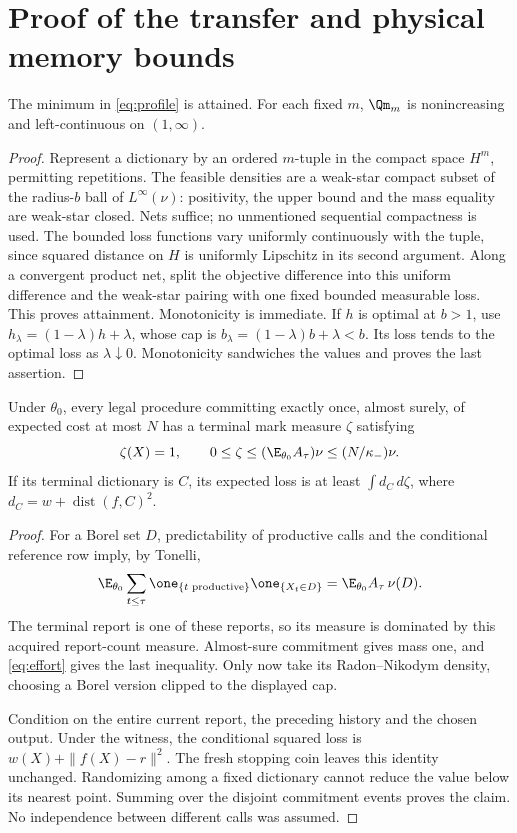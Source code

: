 \section{Proof of the transfer and physical memory bounds}
\begin{lemma}\label{lem:attain}
The minimum in \eqref{eq:profile} is attained. For each fixed $m$, $\Qm_m$ is nonincreasing and left-continuous on $(1,\infty)$.
\end{lemma}
\begin{proof}
Represent a dictionary by an ordered $m$-tuple in the compact space $H^m$, permitting repetitions. The feasible densities are a weak-star compact subset of the radius-$b$ ball of $L^\infty(\nu)$: positivity, the upper bound and the mass equality are weak-star closed. Nets suffice; no unmentioned sequential compactness is used. The bounded loss functions vary uniformly continuously with the tuple, since squared distance on $H$ is uniformly Lipschitz in its second argument. Along a convergent product net, split the objective difference into this uniform difference and the weak-star pairing with one fixed bounded measurable loss. This proves attainment. Monotonicity is immediate. If $h$ is optimal at $b>1$, use $h_\lambda=(1-\lambda)h+\lambda$, whose cap is $b_\lambda=(1-\lambda)b+\lambda<b$. Its loss tends to the optimal loss as $\lambda\downarrow0$. Monotonicity sandwiches the values and proves the last assertion.
\end{proof}

\begin{lemma}\label{lem:lower}
Under $\theta_0$, every legal procedure committing exactly once, almost surely, of expected cost at most $N$ has a terminal mark measure $\zeta$ satisfying
\begin{equation}\label{eq:dominated-terminal}
 \zeta(X)=1,\qquad
 0\le\zeta\le (\E_{\theta_0}A_\tau)\nu\le (N/\kappa_-)\nu.
\end{equation}
If its terminal dictionary is $C$, its expected loss is at least $\int d_C\,d\zeta$, where $d_C=w+\operatorname{dist}(f,C)^2$.
\end{lemma}
\begin{proof}
For a Borel set $D$, predictability of productive calls and the conditional reference row imply, by Tonelli,
\[
 \E_{\theta_0}\sum_{t\le\tau}\one_{\{t\text{ productive}\}}\one_{\{X_t\in D\}}
   =\E_{\theta_0}A_\tau\,\nu(D).
\]
The terminal report is one of these reports, so its measure is dominated by this acquired report-count measure. Almost-sure commitment gives mass one, and \eqref{eq:effort} gives the last inequality. Only now take its Radon--Nikodym density, choosing a Borel version clipped to the displayed cap.

Condition on the entire current report, the preceding history and the chosen output. Under the witness, the conditional squared loss is $w(X)+\|f(X)-r\|^2$. The fresh stopping coin leaves this identity unchanged. Randomizing among a fixed dictionary cannot reduce the value below its nearest point. Summing over the disjoint commitment events proves the claim. No independence between different calls was assumed.
\end{proof}

